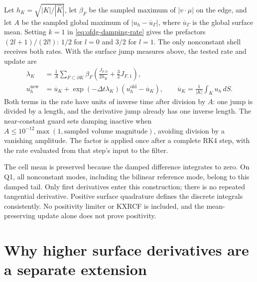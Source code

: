 Let $h_K=\sqrt{|K|/|\widehat K|}$, let $\beta_F$ be the sampled maximum
of $|v\cdot\mu|$ on the edge, and let $A$ be the sampled global maximum
of $|u_h-\overline u_\Gamma|$, where $\overline u_\Gamma$ is the global
surface mean. Setting $k=1$ in \cref{eq:ofdg-damping-rate} gives
the prefactors $(2l+1)/(2l!)$: $1/2$ for $l=0$ and $3/2$ for $l=1$.
The only nonconstant shell receives both rates. With the surface jump
measures above, the tested rate and update are
\begin{align}
 \lambda_K&=\frac1A\sum_{F\subset\partial K}\beta_F
              \left(\frac{J_{F,0}}{2h_K}+\frac32J_{F,1}\right),\\
 u_h^{\mathrm{new}}&=\overline u_K+
        \exp(-\Delta t\lambda_K)(u_h^{\mathrm{old}}-\overline u_K),
 \qquad \overline u_K=\frac1{|K|}\int_Ku_h\,dS.
 \label{eq:app-surface-damping}
\end{align}
Both terms in the rate have units of inverse time after division by $A$:
one jump is divided by a length, and the derivative jump already has one
inverse length. The near-constant guard sets damping inactive when
$A\le10^{-12}\max(1,\text{sampled volume magnitude})$, avoiding division
by a vanishing amplitude. The factor is applied once after a complete RK4
step, with the rate evaluated from that step's input to the filter.

The cell mean is preserved because the damped difference integrates to
zero. On Q1, all nonconstant modes, including the bilinear reference mode,
belong to this damped tail. Only first derivatives enter this construction;
there is no repeated tangential derivative. Positive surface quadrature
defines the discrete integrals consistently. No positivity limiter or KXRCF
is included, and the mean-preserving update alone does not prove positivity.

\section{Why higher surface derivatives are a separate extension}
\label{sec:appendix-surface-boundary}

